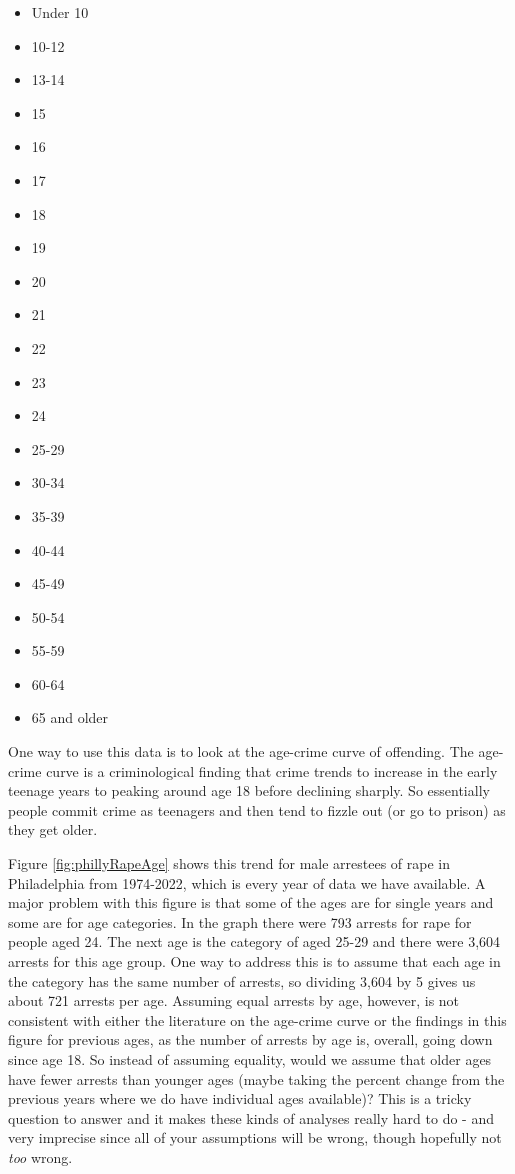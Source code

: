 \documentclass[
]{krantz}
\providecommand{\tightlist}{%
  \setlength{\itemsep}{0pt}\setlength{\parskip}{0pt}}
\begin{document}
\begin{itemize}
\tightlist
\item
  Under 10
\item
  10-12
\item
  13-14
\item
  15
\item
  16
\item
  17
\item
  18
\item
  19
\item
  20
\item
  21
\item
  22
\item
  23
\item
  24
\item
  25-29
\item
  30-34
\item
  35-39
\item
  40-44
\item
  45-49
\item
  50-54
\item
  55-59
\item
  60-64
\item
  65 and older
\end{itemize}

One way to use this data is to look at the age-crime curve
of offending. The age-crime curve is a criminological
finding that crime trends to increase in the early teenage
years to peaking around age 18 before declining sharply. So
essentially people commit crime as teenagers and then tend
to fizzle out (or go to prison) as they get older.

Figure \ref{fig:phillyRapeAge} shows this trend for male
arrestees of rape in Philadelphia from 1974-2022, which is
every year of data we have available. A major problem with
this figure is that some of the ages are for single years
and some are for age categories. In the graph there were 793
arrests for rape for people aged 24. The next age is the
category of aged 25-29 and there were 3,604 arrests for this
age group. One way to address this is to assume that each
age in the category has the same number of arrests, so
dividing 3,604 by 5 gives us about 721 arrests per age.
Assuming equal arrests by age, however, is not consistent
with either the literature on the age-crime curve or the
findings in this figure for previous ages, as the number of
arrests by age is, overall, going down since age 18. So
instead of assuming equality, would we assume that older
ages have fewer arrests than younger ages (maybe taking the
percent change from the previous years where we do have
individual ages available)? This is a tricky question to
answer and it makes these kinds of analyses really hard to
do - and very imprecise since all of your assumptions will
be wrong, though hopefully not \emph{too} wrong.
\end{document}
